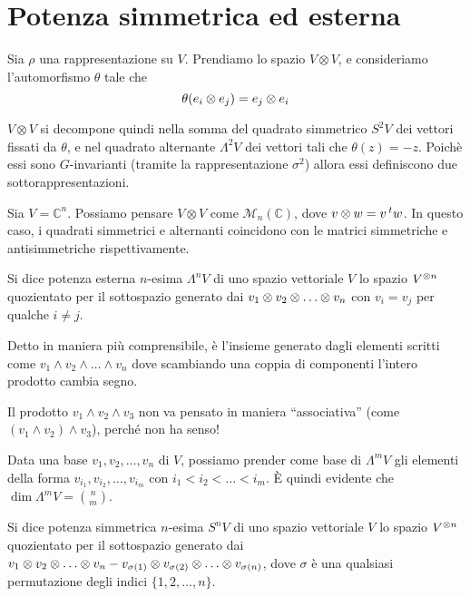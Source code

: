\section{Potenza simmetrica ed esterna}

\begin{mydef}
  Sia $\rho$ una rappresentazione su $V$. Prendiamo lo spazio $V\otimes V$, e consideriamo l'automorfismo $\theta$ tale che 
  \[
  \theta(e_i \otimes e_j) = e_j \otimes e_i
  \]
  
  $V\otimes V$ si decompone quindi nella somma del quadrato simmetrico $S^2V$ dei vettori fissati da $\theta$, e nel quadrato alternante $\Lambda^2V$ dei vettori tali che $\theta(z) = -z$. Poichè essi sono $G$-invarianti (tramite la rappresentazione $\sigma^2$) allora essi definiscono due sottorappresentazioni.
\end{mydef}

\begin{myexample}
  Sia $V=\mathbb C^n$. Possiamo pensare $V\otimes V$ come $\mathcal M_n(\mathbb C)$, dove $v \otimes w = v\prescript{t}{}{w}$. In questo caso, i quadrati simmetrici e alternanti coincidono con le matrici simmetriche e antisimmetriche rispettivamente.
\end{myexample}

\begin{mydef}
  Si dice potenza esterna $n$-esima $\Lambda^nV$  di uno spazio vettoriale $V$ lo spazio $V^{\otimes n}$ quozientato per il sottospazio generato dai $v_1 \tensor v_2 \tensor \dots \tensor v_n$ con $v_i=v_j$ per qualche $i\ne j$.  
\end{mydef}

Detto in maniera più comprensibile, è l'insieme generato dagli elementi scritti come $v_1 \wedge v_2 \wedge \dots \wedge v_n$ dove scambiando una coppia di componenti l'intero prodotto cambia segno.

\begin{Achtung}
  Il prodotto $v_1 \wedge v_2 \wedge v_3$ non va pensato in maniera ``associativa'' (come $(v_1 \wedge v_2) \wedge v_3$), perché non ha senso!
\end{Achtung}

Data una base $v_1,v_2,\dots,v_n$ di $V$, possiamo prender come base di $\Lambda^mV$ gli elementi della forma $v_{i_1},v_{i_2},\dots,v_{i_m}$ con $i_1<i_2<\dots<i_m$. \`E quindi evidente che $\dim \Lambda^mV=\binom nm$.    
  
\begin{mydef}
  Si dice potenza simmetrica $n$-esima $S^nV$  di uno spazio vettoriale $V$ lo spazio $V^{\otimes n}$ quozientato per il sottospazio generato dai $v_1 \tensor v_2 \tensor \dots \tensor v_n - v_{\sigma(1)} \tensor v_{\sigma(2)} \tensor \dots \tensor v_{\sigma(n)}$, dove $\sigma$ è una qualsiasi permutazione degli indici $\{1,2,\dots,n\}$.  
\end{mydef}

